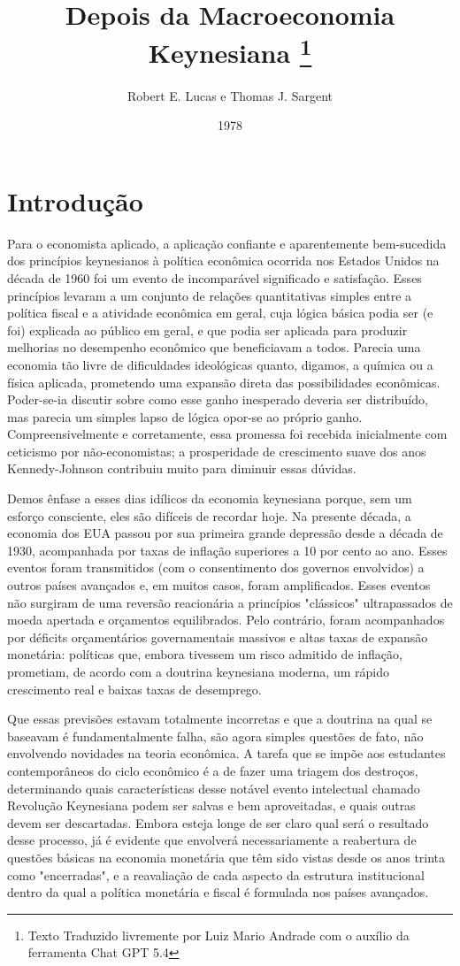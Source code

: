 \documentclass[12pt]{article}
\title{Depois da Macroeconomia Keynesiana \thanks{Texto Traduzido livremente por Luiz Mario Andrade com o auxílio da ferramenta Chat GPT 5.4}}
\author{Robert E. Lucas e Thomas J. Sargent}
\date{1978}
\begin{document}
\maketitle

\section{Introdução}

Para o economista aplicado, a aplicação confiante e aparentemente bem-sucedida dos princípios keynesianos à política econômica ocorrida nos Estados Unidos na década de 1960 foi um evento de incomparável significado e satisfação. Esses princípios levaram a um conjunto de relações quantitativas simples entre a política fiscal e a atividade econômica em geral, cuja lógica básica podia ser (e foi) explicada ao público em geral, e que podia ser aplicada para produzir melhorias no desempenho econômico que beneficiavam a todos. Parecia uma economia tão livre de dificuldades ideológicas quanto, digamos, a química ou a física aplicada, prometendo uma expansão direta das possibilidades econômicas. Poder-se-ia discutir sobre como esse ganho inesperado deveria ser distribuído, mas parecia um simples lapso de lógica opor-se ao próprio ganho. Compreensivelmente e corretamente, essa promessa foi recebida inicialmente com ceticismo por não-economistas; a prosperidade de crescimento suave dos anos Kennedy-Johnson contribuiu muito para diminuir essas dúvidas.

Demos ênfase a esses dias idílicos da economia keynesiana porque, sem um esforço consciente, eles são difíceis de recordar hoje. Na presente década, a economia dos EUA passou por sua primeira grande depressão desde a década de 1930, acompanhada por taxas de inflação superiores a 10 por cento ao ano. Esses eventos foram transmitidos (com o consentimento dos governos envolvidos) a outros países avançados e, em muitos casos, foram amplificados. Esses eventos não surgiram de uma reversão reacionária a princípios "clássicos" ultrapassados de moeda apertada e orçamentos equilibrados. Pelo contrário, foram acompanhados por déficits orçamentários governamentais massivos e altas taxas de expansão monetária: políticas que, embora tivessem um risco admitido de inflação, prometiam, de acordo com a doutrina keynesiana moderna, um rápido crescimento real e baixas taxas de desemprego.

Que essas previsões estavam totalmente incorretas e que a doutrina na qual se baseavam é fundamentalmente falha, são agora simples questões de fato, não envolvendo novidades na teoria econômica. A tarefa que se impõe aos estudantes contemporâneos do ciclo econômico é a de fazer uma triagem dos destroços, determinando quais características desse notável evento intelectual chamado Revolução Keynesiana podem ser salvas e bem aproveitadas, e quais outras devem ser descartadas. Embora esteja longe de ser claro qual será o resultado desse processo, já é evidente que envolverá necessariamente a reabertura de questões básicas na economia monetária que têm sido vistas desde os anos trinta como "encerradas", e a reavaliação de cada aspecto da estrutura institucional dentro da qual a política monetária e fiscal é formulada nos países avançados.
\end{document}
